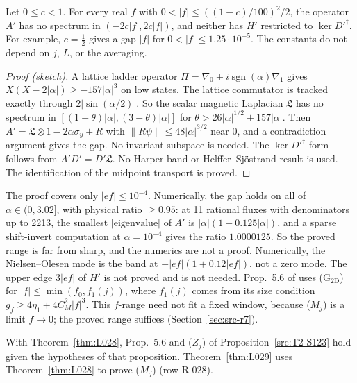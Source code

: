\begin{theorem}\label{thm:L028}
Let $0\le c<1$. For every real $f$ with $0<|f|\le((1-c)/100)^2/2$, the operator $A'$ has no spectrum in $(-2c|f|,2c|f|)$, and neither has $H'$ restricted to $\ker D'^\dagger$. For example, $c=\tfrac12$ gives a gap $|f|$ for $0<|f|\le1.25\cdot10^{-5}$. The constants do not depend on $j$, $L$, or the averaging.
\end{theorem}
\begin{proof}[Proof (sketch)]
A lattice ladder operator $\Pi=\nabla_0+i\operatorname{sgn}(\alpha)\nabla_1$ gives $X(X-2|\alpha|)\ge-157|\alpha|^3$ on low states. The lattice commutator is tracked exactly through $2|\sin(\alpha/2)|$. So the scalar magnetic Laplacian $\mathfrak L$ has no spectrum in $[(1+\theta)|\alpha|,(3-\theta)|\alpha|]$ for $\theta>26|\alpha|^{1/2}+157|\alpha|$. Then $A'=\mathfrak L\otimes1-2\alpha\sigma_y+R$ with $\|R\psi\|\le48|\alpha|^{3/2}$ near 0, and a contradiction argument gives the gap. No invariant subspace is needed. The $\ker D'^\dagger$ form follows from $A'D'=D'\mathfrak L$. No Harper-band or Helffer--Sj\"ostrand result is used. The identification of the midpoint transport is proved.
\end{proof}

\begin{remark}\label{rem:GAprime}
The proof covers only $|ef|\le10^{-4}$. Numerically, the gap holds on all of $\alpha\in(0,3.02]$, with physical ratio $\ge0.95$: at 11 rational fluxes with denominators up to 2213, the smallest $|\text{eigenvalue}|$ of $A'$ is $|\alpha|(1-0.125|\alpha|)$, and a sparse shift-invert computation at $\alpha=10^{-4}$ gives the ratio $1.0000125$. So the proved range is far from sharp, and the numerics are not a proof. Numerically, the Nielsen--Olesen mode is the band at $-|ef|(1+0.12|ef|)$, not a zero mode. The upper edge $3|ef|$ of $H'$ is not proved and is not needed. Prop.~5.6 of  uses (G$_{\mathrm{2D}}$) for $|f|\le\min(f_0,f_1(j))$, where $f_1(j)$ comes from its size condition $g_f\ge4\eta_1+4C_M^2|f|^3$. This $f$-range need not fit a fixed window, because ($M_j$) is a limit $f\to0$; the proved range suffices (Section~\ref{sec:src-r7}).
\end{remark}
With Theorem~\ref{thm:L028}, Prop.~5.6 and ($Z_j$) of Proposition~\ref{src:T2-S123} hold given the hypotheses of that proposition. Theorem~\ref{thm:L029} uses Theorem~\ref{thm:L028} to prove ($M_j$) (row R-028).

